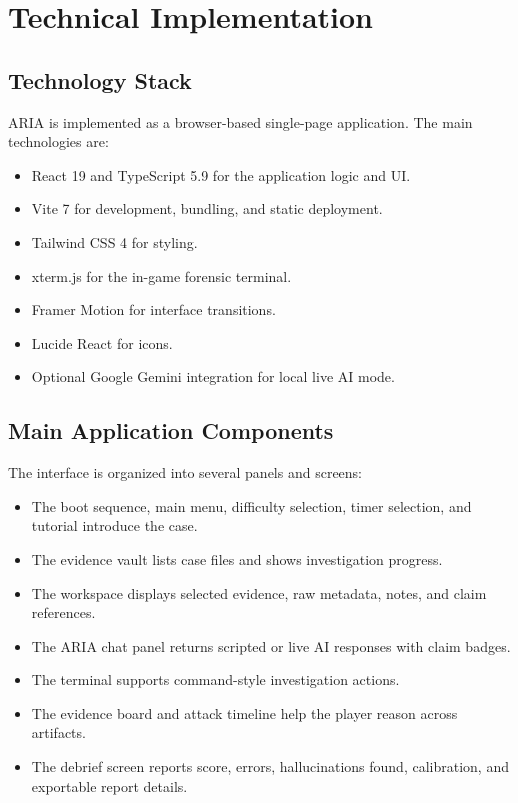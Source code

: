 \chapter{Technical Implementation}

\section{Technology Stack}

ARIA is implemented as a browser-based single-page application. The main technologies are:

\begin{itemize}[leftmargin=*]
  \item React 19 and TypeScript 5.9 for the application logic and UI.
  \item Vite 7 for development, bundling, and static deployment.
  \item Tailwind CSS 4 for styling.
  \item xterm.js for the in-game forensic terminal.
  \item Framer Motion for interface transitions.
  \item Lucide React for icons.
  \item Optional Google Gemini integration for local live AI mode.
\end{itemize}

\section{Main Application Components}

The interface is organized into several panels and screens:

\begin{itemize}[leftmargin=*]
  \item The boot sequence, main menu, difficulty selection, timer selection, and tutorial introduce the case.
  \item The evidence vault lists case files and shows investigation progress.
  \item The workspace displays selected evidence, raw metadata, notes, and claim references.
  \item The ARIA chat panel returns scripted or live AI responses with claim badges.
  \item The terminal supports command-style investigation actions.
  \item The evidence board and attack timeline help the player reason across artifacts.
  \item The debrief screen reports score, errors, hallucinations found, calibration, and exportable report details.
\end{itemize}

